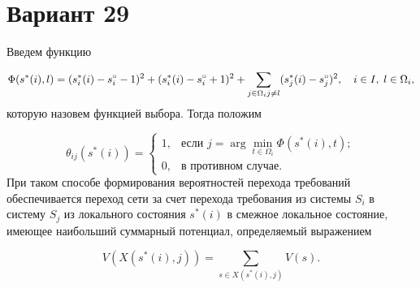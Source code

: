 \documentclass{article}
\begin{document}
\section*{Вариант 29}
Введем функцию

\begin{equation}
  \Phi(s^*(i), l) = (s_i^*(i) - s_i^{\circ} - 1)^2 + (s_i^*(i) - s_i^{\circ} + 1)^2 + \sum_{j \in \Omega_i \\ j \neq l} (s_j^*(i) - s_j^{\circ})^2, \quad i \in I, \; l \in \Omega_i,
\end{equation}
которую назовем функцией выбора. Тогда положим 

\begin{equation}
  \theta_{ij}(s^*(i)) = 
\begin{cases}
1, & \text{если } j = \arg\min\limits_{t \in \Omega_i} \Phi(s^*(i), t); \\
0, & \text{в противном случае.}
\end{cases}
\end{equation}
При таком способе формирования вероятностей перехода требований обеспечивается переход
сети за счет перехода требования из системы $S_i$ в систему $S_j$ из локального состояния $s^*(i)$
в смежное локальное состояние, имеющее наибольший суммарный потенциал, определяемый
выражением

\begin{equation*}
  V(X(s^*(i),j)) = \sum_{s \in X(s^*(i),j)} V(s).
\end{equation*}
\end{document}
